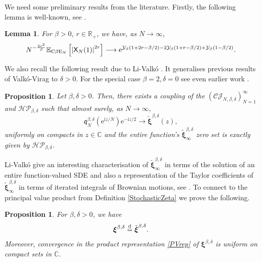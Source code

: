 \documentclass[]{article}
\newtheorem{lem}[thm]{Lemma}
\newtheorem{prop}[thm]{Proposition}
\begin{document}
We need some preliminary results from the literature. Firstly, the following lemma is well-known, see \cite{RandomDets}.
\begin{lem}\label{AsymptoticsPartition}
For $\beta>0$, $r \in \mathbb{R}_+$, we have, as $N \to \infty$,
\begin{equation*}
N^{-\frac{2r^2}{\beta}}\mathbb{E}_{\textnormal{C}\beta \textnormal{E}_N}\left[\left|\mathsf{X}_N(1)\right|^{2r}\right]\longrightarrow \mathrm{e}^{\mathcal{Y}_\beta\left(1+2r-\beta/2\right)-2\mathcal{Y}_\beta \left(1+r-\beta/2\right)+\mathcal{Y}_\beta(1-\beta/2)}.
\end{equation*}
\end{lem}


We also recall the following result due to Li-Valk\'{o} \cite{LiValko}. It generalises previous results of Valk\'{o}-Virag \cite{ValkoVirag} to $\delta>0$. For the special case $\beta=2,\delta=0$ see even earlier work \cite{CNN}.

\begin{prop}\label{LiValkoProp} Let $\beta,\delta>0$.
Then, there exists a coupling of the $(\mathcal{CJ}_{N,\beta,\delta})_{N=1}^\infty$ and $\mathcal{HP_{\beta,\delta}}$ such that almost surely, as $N \to \infty$,
\begin{equation*}
\mathfrak{q}^{\beta,\delta}_N(\mathrm{e}^{\mathrm{i}z/N})\mathrm{e}^{-\mathrm{i}z/2}\longrightarrow\tilde{\boldsymbol{\xi}}^{\beta,\delta}(z),
\end{equation*}
uniformly on compacts in $z\in \mathbb{C}$ and the entire function's $\tilde{\boldsymbol{\xi}}_{\infty}^{\beta,\delta}$ zero set is exactly given by $\mathcal{HP}_{\beta,\delta}$.
\end{prop}

Li-Valk\'{o} give an interesting characterisation of $\tilde{\boldsymbol{\xi}}_\infty^{\beta,\delta}$ in terms of the solution of an entire function-valued SDE and also a representation of the Taylor coefficients of $\tilde{\boldsymbol{\xi}}_\infty^{\beta,\delta}$ in terms of iterated integrals of Brownian motions, see \cite{LiValko}. To connect to the principal value product from Definition \ref{StochasticZeta} we prove the following.  

\begin{prop}\label{PropPVRep}
For $\beta, \delta >0$, we have 
\begin{equation}
\boldsymbol{\xi}^{\beta,\delta}\overset{\textnormal{d}}{=} \tilde{\boldsymbol{\xi}}^{\beta,\delta}.
\end{equation}
Moreover, convergence in the product representation \eqref{PVrep} of $\boldsymbol{\xi}^{\beta,\delta}$ is uniform on compact sets in $\mathbb{C}$.
\end{prop}
\end{document}
